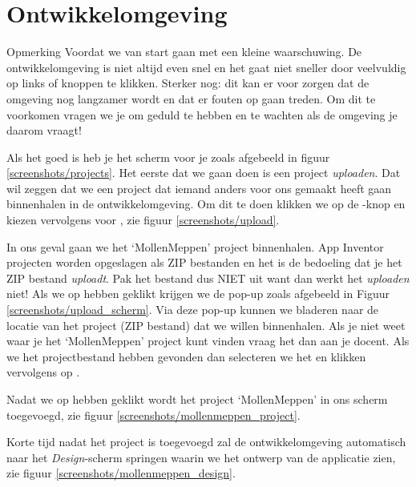 \chapter{Ontwikkelomgeving}
\label{chap:ontwikkelomgeving}

\begin{derivation}{Opmerking}
Voordat we van start gaan met \ai een kleine waarschuwing. De ontwikkelomgeving is niet altijd even snel en het gaat niet sneller door veelvuldig op links of knoppen te klikken. Sterker nog: dit kan er voor zorgen dat de omgeving nog langzamer wordt en dat er fouten op gaan treden. Om dit te voorkomen vragen we je om geduld te hebben en te wachten als de omgeving je daarom vraagt!
\end{derivation}

Als het goed is heb je het scherm voor je zoals afgebeeld in figuur \ref{screenshots/projects}. Het eerste dat we gaan doen is een project \emph{uploaden}. Dat wil zeggen dat we een project dat iemand anders voor ons gemaakt heeft gaan binnenhalen in de  ontwikkelomgeving. Om dit te doen klikken we op de -knop en kiezen vervolgens voor , zie figuur \ref{screenshots/upload}.


In ons geval gaan we het `MollenMeppen' project binnenhalen. App Inventor projecten worden opgeslagen als ZIP bestanden en het is de bedoeling dat je het ZIP bestand \emph{uploadt}. Pak het bestand dus NIET uit want dan werkt het \emph{uploaden} niet! Als we op  hebben geklikt krijgen we de pop-up zoals afgebeeld in Figuur \ref{screenshots/upload_scherm}. Via deze pop-up kunnen we bladeren naar de locatie van het project (ZIP bestand) dat we willen binnenhalen. Als je niet weet waar je het `MollenMeppen' project kunt vinden vraag het dan aan je docent.
Als we het projectbestand hebben gevonden dan selecteren we het en klikken vervolgens op .
 
Nadat  we op  hebben geklikt wordt het project `MollenMeppen' in ons scherm toegevoegd, zie figuur \ref{screenshots/mollenmeppen_project}.


Korte tijd nadat het project is toegevoegd zal de ontwikkelomgeving automatisch naar het \emph{Design}-scherm springen waarin we het ontwerp van de applicatie zien, zie figuur \ref{screenshots/mollenmeppen_design}. 

